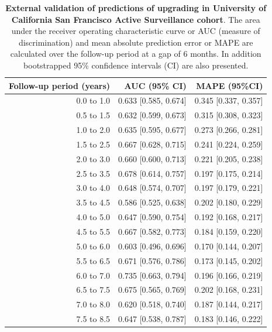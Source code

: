\begin{table}[!htb]
\small\sf\centering
\caption{\textbf{External validation of predictions of upgrading in University of California San Francisco Active Surveillance cohort}. The area under the receiver operating characteristic curve or AUC (measure of discrimination) and mean absolute prediction error or MAPE are calculated over the follow-up period at a gap of 6 months. In addition bootstrapped 95\% confidence intervals (CI) are also presented.}
\label{tab:AUC_PE_UCSF}
\begin{tabular}{r|r|r}
\hline
\hline
Follow-up period (years) & AUC (95\% CI) & MAPE (95\%CI)\\ 
\hline
0.0 to 1.0 & 0.633 [0.585, 0.674] & 0.345 [0.337, 0.357]\\
0.5 to 1.5 & 0.632 [0.599, 0.673] & 0.315 [0.308, 0.323]\\
1.0 to 2.0 & 0.635 [0.595, 0.677] & 0.273 [0.266, 0.281]\\
1.5 to 2.5 & 0.667 [0.628, 0.715] & 0.241 [0.224, 0.259]\\
2.0 to 3.0 & 0.660 [0.600, 0.713] & 0.221 [0.205, 0.238]\\
2.5 to 3.5 & 0.678 [0.614, 0.757] & 0.197 [0.175, 0.214]\\
3.0 to 4.0 & 0.648 [0.574, 0.707] & 0.197 [0.179, 0.221]\\
3.5 to 4.5 & 0.586 [0.525, 0.638] & 0.202 [0.180, 0.229]\\
4.0 to 5.0 & 0.647 [0.590, 0.754] & 0.192 [0.168, 0.217]\\
4.5 to 5.5 & 0.667 [0.582, 0.773] & 0.184 [0.159, 0.220]\\
5.0 to 6.0 & 0.603 [0.496, 0.696] & 0.170 [0.144, 0.207]\\
5.5 to 6.5 & 0.671 [0.576, 0.786] & 0.173 [0.145, 0.202]\\
6.0 to 7.0 & 0.735 [0.663, 0.794] & 0.196 [0.166, 0.219]\\
6.5 to 7.5 & 0.675 [0.565, 0.769] & 0.202 [0.168, 0.231]\\
7.0 to 8.0 & 0.620 [0.518, 0.740] & 0.187 [0.144, 0.217]\\
7.5 to 8.5 & 0.647 [0.538, 0.787] & 0.183 [0.146, 0.222]\\
\hline
\end{tabular}    
\end{table}

